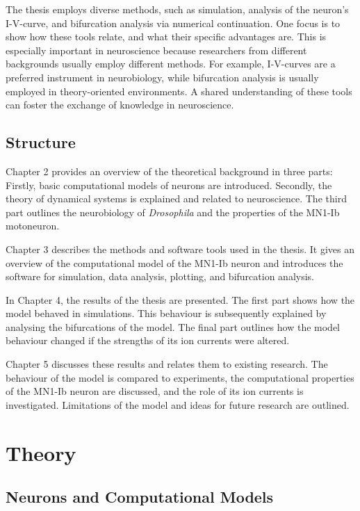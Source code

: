 \documentclass[12pt,a4paper,]{report}
\begin{document}
The thesis employs diverse methods, such as simulation, analysis of the
neuron's I-V-curve, and bifurcation analysis via numerical continuation.
One focus is to show how these tools relate, and what their specific
advantages are. This is especially important in neuroscience because
researchers from different backgrounds usually employ different methods.
For example, I-V-curves are a preferred instrument in neurobiology,
while bifurcation analysis is usually employed in theory-oriented
environments. A shared understanding of these tools can foster the
exchange of knowledge in neuroscience.

\section{Structure}\label{structure}

Chapter 2 provides an overview of the theoretical background in three
parts: Firstly, basic computational models of neurons are introduced.
Secondly, the theory of dynamical systems is explained and related to
neuroscience. The third part outlines the neurobiology of
\emph{Drosophila} and the properties of the MN1-Ib motoneuron.

Chapter 3 describes the methods and software tools used in the thesis.
It gives an overview of the computational model of the MN1-Ib neuron and
introduces the software for simulation, data analysis, plotting, and
bifurcation analysis.

In Chapter 4, the results of the thesis are presented. The first part
shows how the model behaved in simulations. This behaviour is
subsequently explained by analysing the bifurcations of the model. The
final part outlines how the model behaviour changed if the strengths of
its ion currents were altered.

Chapter 5 discusses these results and relates them to existing research.
The behaviour of the model is compared to experiments, the computational
properties of the MN1-Ib neuron are discussed, and the role of its ion
currents is investigated. Limitations of the model and ideas for future
research are outlined.

\chapter{Theory}\label{theory}

\section{Neurons and Computational
Models}\label{neurons-and-computational-models}
\end{document}
